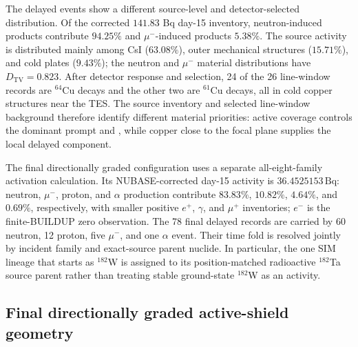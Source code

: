\documentclass[11pt]{article}
\begin{document}
The delayed events show a different source-level and detector-selected
distribution. Of the corrected $141.83$ Bq day-15 inventory, neutron-induced
products contribute $94.25\%$ and $\mu^-$-induced products $5.38\%$. The source
activity is distributed mainly among CsI ($63.08\%$), outer mechanical
structures ($15.71\%$), and cold plates ($9.43\%$); the neutron and $\mu^-$
material distributions have $D_{\mathrm{TV}}=0.823$. After detector response and
selection, 24 of the 26 line-window records are $^{64}$Cu decays and the other
two are $^{61}$Cu decays, all in cold copper structures near the TES. The
source inventory and selected line-window background therefore identify
different material priorities: active coverage controls the dominant prompt and
, while copper close to the focal plane supplies the local
delayed component.

The final directionally graded configuration uses a separate all-eight-family
activation calculation.
Its NUBASE-corrected day-15 activity is $36.4525153\,\mathrm{Bq}$: neutron,
$\mu^-$, proton, and $\alpha$ production contribute $83.83\%$, $10.82\%$,
$4.64\%$, and $0.69\%$, respectively, with smaller positive $e^+$, $\gamma$,
and $\mu^+$ inventories; $e^-$ is the finite-BUILDUP zero observation. The 78
final delayed records are carried by 60 neutron, 12 proton, five $\mu^-$, and one
$\alpha$ event. Their time fold is resolved jointly by incident family and
exact-source parent nuclide. In particular, the one SIM lineage that starts as
$^{182}$W is assigned to its position-matched radioactive $^{182}$Ta source
parent rather than treating stable ground-state $^{182}$W as an activity.

\FloatBarrier

\subsection{Final directionally graded active-shield geometry}
\label{subsec:optimized_shield_results}
\end{document}
